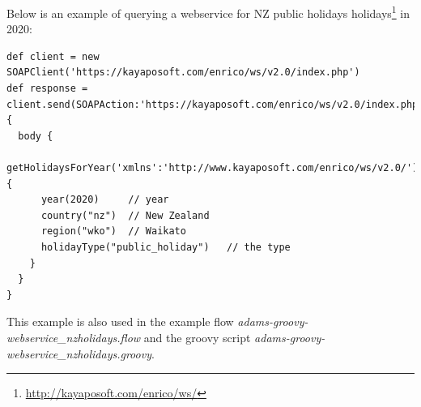 \documentclass[a4paper]{book}
\begin{document}
Below is an example of querying a webservice for NZ public holidays
holidays\footnote{\url{http://kayaposoft.com/enrico/ws/}{}} in 2020:
{\scriptsize
\begin{verbatim}
def client = new SOAPClient('https://kayaposoft.com/enrico/ws/v2.0/index.php')
def response = client.send(SOAPAction:'https://kayaposoft.com/enrico/ws/v2.0/index.php') {
  body {
    getHolidaysForYear('xmlns':'http://www.kayaposoft.com/enrico/ws/v2.0/') {
      year(2020)     // year
      country("nz")  // New Zealand
      region("wko")  // Waikato
      holidayType("public_holiday")   // the type
    }
  }
}
\end{verbatim}
}
\noindent This example is also used in the example flow
\textit{adams-groovy-webservice\_nzholidays.flow} and the groovy script
\textit{adams-groovy-webservice\_nzholidays.groovy}.



\end{document}
